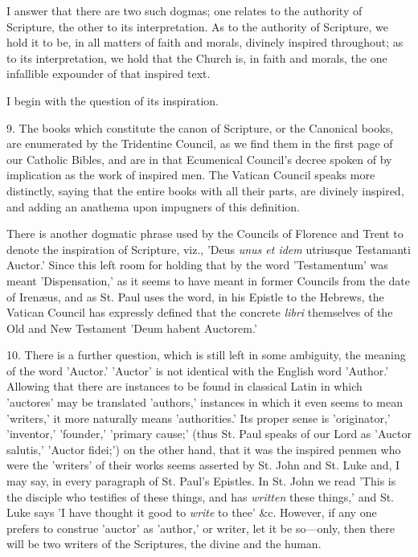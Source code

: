I answer that there are two such dogmas; one
relates to the authority of Scripture, the other to its
interpretation. As to the authority of Scripture, we hold it to be, in
all matters of faith and morals, divinely inspired throughout; as to
its interpretation, we hold that the Church is, in faith and morals,
the one infallible expounder of that inspired text.

I begin with the question of its inspiration.

9. The books which constitute the canon of
Scripture, or the Canonical books, are enumerated by the Tridentine
Council, as we find them in the first page of our Catholic Bibles, and
are in that Ecumenical Council's decree spoken of by implication as
the work of inspired men. The Vatican Council speaks more distinctly,
saying that the entire books with all their parts, are divinely
inspired, and adding an anathema upon impugners of this definition.

There is another dogmatic phrase used by the
Councils of Florence and Trent to denote the inspiration of Scripture,
viz., 'Deus \emph{unus et idem} utriusque Testamanti Auctor.' Since
this left room for holding that by the word 'Testamentum' was meant
'Dispensation,' as it seems to have meant in former Councils from the
date of Irenæus, and as St. Paul uses the word, in his Epistle to the
Hebrews, the Vatican Council has expressly defined that the concrete \emph{libri}
themselves of the Old and New Testament 'Deum habent Auctorem.'

10. There is a further question, which is still
left in some ambiguity, the meaning of the word 'Auctor.' 'Auctor' is
not identical with the English word 'Author.' Allowing that there are
instances to be found in classical Latin in which 'auctores' may be
translated 'authors,' instances in which it even seems to mean
'writers,' it more naturally means 'authorities.' Its proper sense is
'originator,' 'inventor,' 'founder,' 'primary cause;' (thus St. Paul
speaks of our Lord as 'Auctor salutis,' 'Auctor fidei;') on the other
hand, that it was the inspired penmen who were the 'writers' of their
works seems asserted by St. John and St. Luke and, I may say, in every
paragraph of St. Paul's Epistles. In St. John we read 'This is the
disciple who testifies of these things, and has \emph{written} these
things,' and St. Luke says 'I have thought it good to \emph{write} to
thee' \&c. However, if any one prefers to construe 'auctor' as
'author,' or writer, let it be so—only, then there will be two
writers of the Scriptures, the divine and the human.

